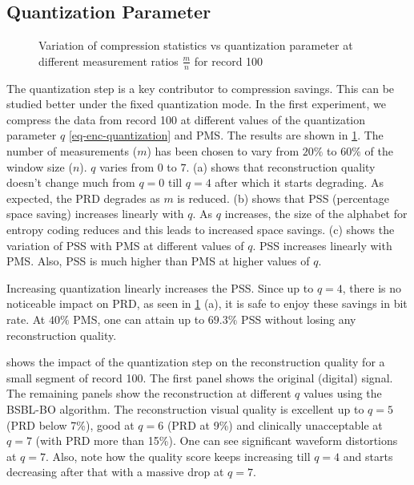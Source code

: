 \subsection{Quantization Parameter}

\begin{figure}
\centering
{}
\hfill
{}
\hfill
{}
\hfill
\caption{Variation of compression statistics vs quantization parameter
at different measurement ratios $\frac{m}{n}$
for record 100}
\label{fig-cs-codec-100-q-mr-stats}
\end{figure}


The quantization step is a key contributor to compression
savings. This can be studied better under the fixed
quantization mode. In the first experiment, we compress
the data from record 100 at different values of
the quantization parameter $q$ \eqref{eq-enc-quantization} and PMS.
The results are shown in \cref{fig-cs-codec-100-q-mr-stats}.
The number of measurements ($m$) has been chosen to vary from
$20\%$ to $60\%$ of the window size ($n$).
$q$ varies from $0$ to $7$.
  (a) shows that reconstruction quality doesn't
change much from $q=0$ till $q=4$ after which it starts degrading.
As expected, the PRD degrades as $m$ is reduced.
(b) shows that PSS (percentage space saving) increases linearly
with $q$. As $q$ increases, the size of the alphabet for
entropy coding reduces and this leads to increased space savings.
(c) shows the variation of PSS with PMS at different values of $q$.
PSS increases linearly with PMS. Also, PSS is much higher
than PMS at higher values of $q$.

Increasing quantization linearly increases the PSS.
Since up to $q=4$, there is no noticeable
impact on PRD, as seen in \cref{fig-cs-codec-100-q-mr-stats} (a),
it is safe to enjoy these savings in bit rate. 
At $40\%$ PMS, one can attain up to $69.3\%$ PSS without
losing any reconstruction quality.

 shows the impact of the
quantization step on the reconstruction quality
for a small segment of record 100.
The first panel shows the original (digital) signal.
The remaining panels show the reconstruction at different $q$ values
using the BSBL-BO algorithm.
The reconstruction visual quality is excellent
up to $q=5$ (PRD below 7\%), good at $q=6$ (PRD at 9\%)
and clinically unacceptable at $q=7$
(with PRD more than 15\%).
One can see significant waveform distortions at $q=7$.
Also, note how the quality score keeps increasing till
$q=4$ and starts decreasing after that with a massive
drop at $q=7$.

